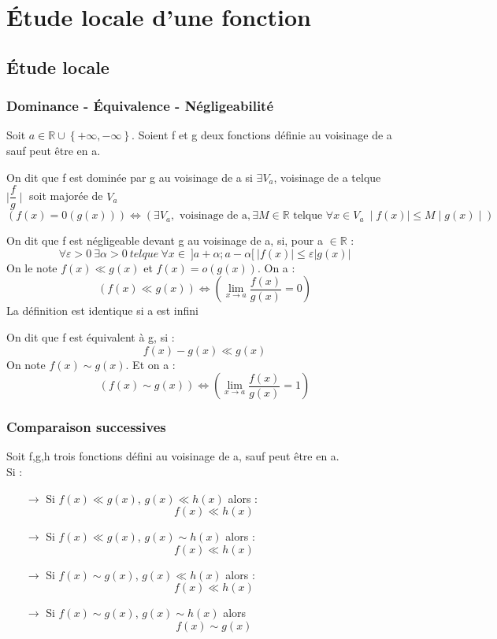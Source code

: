 \chapter{Étude locale d'une fonction}
\section{Étude locale}
\subsection{Dominance - Équivalence - Négligeabilité}
Soit $a \in \mathbb{R} \cup\left\{+\infty,-\infty\right\}$. Soient f et g deux fonctions définie au voisinage de a sauf peut être en a.
\begin{de}
 On dit que f est dominée par g au voisinage de a si $\exists V_a$, voisinage de a telque $\mid \dfrac{f}{g} \mid$ soit majorée de $V_a$ 
$$(f(x) = 0(g(x)))\Leftrightarrow(\exists V_a,\mbox{ voisinage de a}, \exists M \in \mathbb{R} \mbox{ telque } \forall x \in V_a~ \mid f(x) \mid \leq M \mid g(x) \mid)$$
\end{de}
\begin{de}
On dit que f est négligeable devant g au voisinage de a, si, pour a $\in \mathbb{R}$ :
$$\forall \varepsilon > 0~ \exists \alpha > 0~ telque~ \forall x \in~ ]a+\alpha;a-\alpha[~ |f(x)|\leq \varepsilon |g(x)|$$
On le note $f(x) \ll g(x)$ et $f(x)=o(g(x))$. On a : 
$$(f(x) \ll g(x) ) \Leftrightarrow (\lim_{x \rightarrow a} \dfrac{f(x)}{g(x)} = 0)$$
La définition est identique si a est infini
\end{de}
\begin{de}
 On dit que f est équivalent à g, si :
$$f(x)-g(x) \ll g(x)$$
On note $f(x) \sim g(x)$. Et on a : 
$$(f(x)\sim g(x)) \Leftrightarrow (\lim_{x \rightarrow a} \dfrac{f(x)}{g(x)}=1)$$
\end{de}
\subsection{Comparaison successives}
Soit f,g,h trois fonctions défini au voisinage de a, sauf peut être en a.\\
Si :
\begin{itemize}
 \item[$\rightarrow$] Si $f(x)\ll g(x)$, $g(x)\ll h(x)$ alors :
$$f(x)\ll h(x)$$
 \item[$\rightarrow$] Si $f(x)\ll g(x)$, $g(x) \sim h(x) $ alors :
$$f(x) \ll h(x) $$
 \item[$\rightarrow$] Si $f(x) \sim g(x)$, $g(x) \ll h(x)$ alors :
$$f(x) \ll h(x)$$
 \item[$\rightarrow$] Si $f(x) \sim g(x)$, $g(x) \sim h(x)$ alors 
$$f(x) \sim g(x)$$
\end{itemize}
